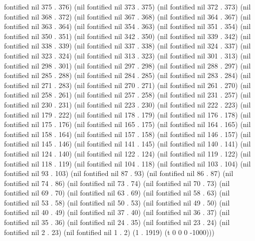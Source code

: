 fontified nil 375 . 376) (nil fontified nil 373 . 375) (nil fontified nil 372 . 373) (nil fontified nil 368 . 372) (nil fontified nil 367 . 368) (nil fontified nil 364 . 367) (nil fontified nil 363 . 364) (nil fontified nil 354 . 363) (nil fontified nil 351 . 354) (nil fontified nil 350 . 351) (nil fontified nil 342 . 350) (nil fontified nil 339 . 342) (nil fontified nil 338 . 339) (nil fontified nil 337 . 338) (nil fontified nil 324 . 337) (nil fontified nil 323 . 324) (nil fontified nil 313 . 323) (nil fontified nil 301 . 313) (nil fontified nil 298 . 301) (nil fontified nil 297 . 298) (nil fontified nil 288 . 297) (nil fontified nil 285 . 288) (nil fontified nil 284 . 285) (nil fontified nil 283 . 284) (nil fontified nil 271 . 283) (nil fontified nil 270 . 271) (nil fontified nil 261 . 270) (nil fontified nil 258 . 261) (nil fontified nil 257 . 258) (nil fontified nil 231 . 257) (nil fontified nil 230 . 231) (nil fontified nil 223 . 230) (nil fontified nil 222 . 223) (nil fontified nil 179 . 222) (nil fontified nil 178 . 179) (nil fontified nil 176 . 178) (nil fontified nil 175 . 176) (nil fontified nil 165 . 175) (nil fontified nil 164 . 165) (nil fontified nil 158 . 164) (nil fontified nil 157 . 158) (nil fontified nil 146 . 157) (nil fontified nil 145 . 146) (nil fontified nil 141 . 145) (nil fontified nil 140 . 141) (nil fontified nil 124 . 140) (nil fontified nil 122 . 124) (nil fontified nil 119 . 122) (nil fontified nil 118 . 119) (nil fontified nil 104 . 118) (nil fontified nil 103 . 104) (nil fontified nil 93 . 103) (nil fontified nil 87 . 93) (nil fontified nil 86 . 87) (nil fontified nil 74 . 86) (nil fontified nil 73 . 74) (nil fontified nil 70 . 73) (nil fontified nil 69 . 70) (nil fontified nil 63 . 69) (nil fontified nil 58 . 63) (nil fontified nil 53 . 58) (nil fontified nil 50 . 53) (nil fontified nil 49 . 50) (nil fontified nil 40 . 49) (nil fontified nil 37 . 40) (nil fontified nil 36 . 37) (nil fontified nil 35 . 36) (nil fontified nil 24 . 35) (nil fontified nil 23 . 24) (nil fontified nil 2 . 23) (nil fontified nil 1 . 2) (1 . 1919) (t 0 0 0 -1000)))
